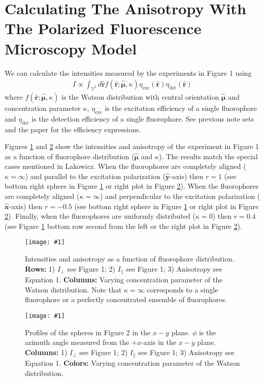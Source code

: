 \documentclass[11pt]{article}
\providecommand{\mh}[1]{\mathbf{\hat{#1}}}
\providecommand{\bs}[1]{\boldsymbol{#1}}
\providecommand{\fig}[4]{
\begin{figure}[h]
 \captionsetup{width=1.0\linewidth}
 \centering
 \texttt{[image: \#1]}
 \caption{#3}
 \label{fig:#4}
\end{figure}
}
\begin{document}
\section{Calculating The Anisotropy With The Polarized Fluorescence Microscopy Model}
We can calculate the intensities measured by the experiments in Figure 1 using
\begin{align}
  I \propto \int_{\mathbb{S}^2}d\mh{r} f(\mh{r}; \hat{\bs{\mu}}, \kappa) \eta_{\text{exc}}(\mh{r}) \eta_{\text{det}}(\mh{r}) \label{eq:ensemble_det}%
\end{align}
where $f(\mh{r}; \hat{\bs{\mu}}, \kappa)$ is the Watson distribution with
central orientation $\hat{\bs{\mu}}$ and concentration parameter $\kappa$,
$\eta_{\text{exc}}$ is the excitation efficiency of a single fluorophore and
$\eta_{\text{det}}$ is the detection efficiency of a single fluorophore. See
previous note sets and the paper for the efficiency expressions. 

Figures \ref{fig:results} and \ref{fig:profile} show the intensities and
anisotropy of the experiment in Figure 1 as a function of fluorophore
distribution ($\hat{\bs{\mu}}$ and $\kappa$). The results match the special
cases mentioned in Lakowicz.  When the fluorophores are completely aligned
($\kappa = \infty$) and parallel to the excitation polarization ($\mh{y}$-axis)
then $r = 1$ (see bottom right sphere in Figure \ref{fig:results} or right plot
in Figure \ref{fig:profile}). When the fluorophores are completely aligned
($\kappa = \infty$) and perpendicular to the excitation polarization
($\mh{x}$-axis) then $r = -0.5$ (see bottom right sphere in Figure
\ref{fig:results} or right plot in Figure \ref{fig:profile}). Finally, when the
fluorophores are uniformly distributed ($\kappa = 0$) then $r = 0.4$ (see Figure
\ref{fig:results} bottom row second from the left or the right plot in Figure
\ref{fig:profile}).

\fig{../figures/anisotropy-kappa.pdf}{1.0}{Intensities and anisotropy as a
  function of fluorophore distribution. \textbf{Rows:} 1) $I_\perp$ see Figure
  1; 2) $I_\parallel$ see Figure 1; 3) Anisotropy see Equation
  1. \textbf{Columns:} Varying concentration parameter of the Watson
  distribution. Note that $\kappa = \infty$ corresponds to a single fluorophore
  or a perfectly concentrated ensemble of fluorophores.}{results}

\fig{../figures/anisotropy-profile.pdf}{1.0}{Profiles of the spheres in Figure 2
  in the $x-y$ plane. $\phi$ is the azimuth angle measured from the $+x$-axis in
  the $x-y$ plane. \textbf{Columns:} 1) $I_\perp$ see Figure 1; 2) $I_\parallel$
  see Figure 1; 3) Anisotropy see Equation 1. \textbf{Colors:} Varying
  concentration parameter of the Watson distribution.}{profile}

{}

\end{document}
